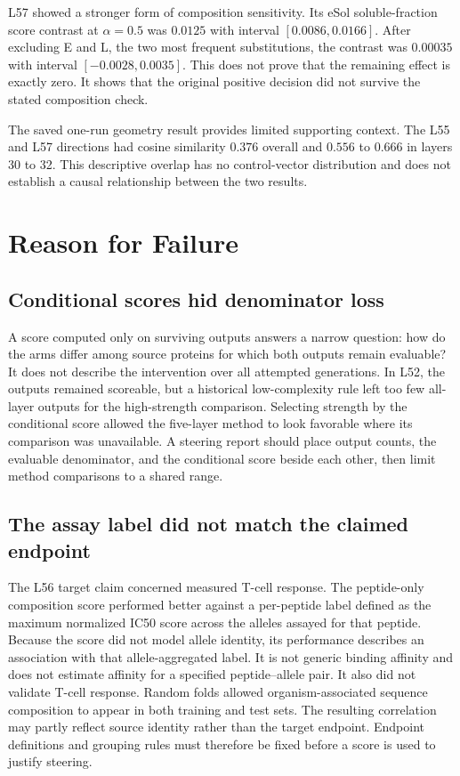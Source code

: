\documentclass{article}
\begin{document}
L57 showed a stronger form of composition sensitivity. Its eSol
soluble-fraction score contrast at $\alpha=0.5$ was $0.0125$ with interval
$[0.0086, 0.0166]$. After excluding E and L, the two most frequent
substitutions, the contrast was $0.00035$ with interval
$[-0.0028, 0.0035]$. This does not prove that the remaining effect is
exactly zero. It shows that the original positive decision did not survive
the stated composition check.

The saved one-run geometry result provides limited supporting context. The
L55 and L57 directions had cosine similarity $0.376$ overall and
$0.556$ to $0.666$ in layers 30 to 32. This descriptive overlap has no
control-vector distribution and does not establish a causal relationship
between the two results.

\section{Reason for Failure}
\label{sec:failure}

\subsection{Conditional scores hid denominator loss}

A score computed only on surviving outputs answers a narrow question: how do
the arms differ among source proteins for which both outputs remain
evaluable? It does not describe the intervention over all attempted
generations. In L52, the outputs remained scoreable, but a historical
low-complexity rule left too few all-layer outputs for the high-strength
comparison. Selecting strength by the conditional score allowed the five-layer
method to look favorable where its comparison was unavailable. A steering
report should place output counts, the evaluable denominator, and the
conditional score beside each other, then limit method comparisons to a shared
range.

\subsection{The assay label did not match the claimed endpoint}

The L56 target claim concerned measured T-cell response. The peptide-only
composition score performed better against a per-peptide label defined as the
maximum normalized IC50 score across the alleles assayed for that peptide.
Because the score did not model allele identity, its performance describes an
association with that allele-aggregated label. It is not generic binding
affinity and does not estimate affinity for a specified peptide--allele pair.
It also did not validate T-cell response. Random folds allowed
organism-associated sequence composition to appear in both training and test
sets. The resulting correlation may partly reflect source identity rather than
the target endpoint. Endpoint definitions and grouping rules must therefore be
fixed before a score is used to justify steering.
\end{document}
